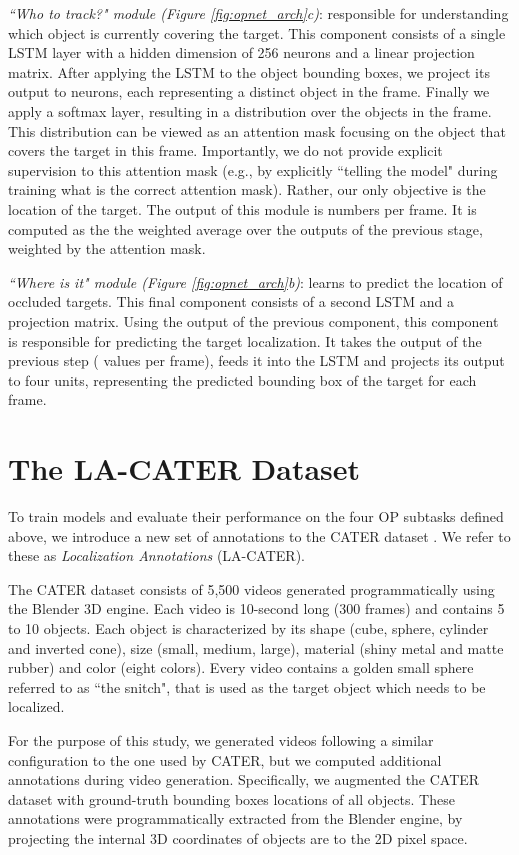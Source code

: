 \documentclass[]{llncs}
\newcommand{\figref}[1]{Figure \ref{#1}}
\begin{document}
\textit{``Who to track?" module (\figref{fig:opnet_arch}c)}: responsible for understanding which object is currently covering the target. This component consists of a single LSTM layer with a hidden dimension of 256 neurons and a linear projection matrix. After applying the LSTM to the object bounding boxes, we project its output to  neurons, each representing a distinct object in the frame.  Finally we apply a softmax layer, resulting in a distribution over the objects in the frame. This distribution can be viewed as an attention mask focusing on the object that covers the target in this frame. Importantly, we do not provide explicit supervision to this attention mask (e.g., by explicitly ``telling the model" during training what is the correct attention mask). Rather, our only objective is the location of the target. The output of this module is  numbers per frame. It is computed as the the weighted average over the  outputs of the previous stage, weighted by the attention mask.

\textit{``Where is it" module (\figref{fig:opnet_arch}b)}: learns to predict the location of occluded targets. This final component consists of a second LSTM and a projection matrix. Using the output of the previous component, this component is responsible for predicting the target localization. It takes the output of the previous step ( values per frame), feeds it into the LSTM and projects its output to four units, representing the predicted bounding box of the target for each frame.

\section{The LA-CATER Dataset}
To train models and evaluate their performance on the four OP subtasks defined above, we introduce a new set of annotations to the CATER dataset \cite{girdhar2019cater}. We refer to these as \textit{Localization Annotations} (LA-CATER). 

The CATER dataset consists of 5,500 videos generated programmatically using the Blender 3D engine. Each video is 10-second long (300 frames) and contains 5 to 10 objects. Each object is characterized by its shape (cube, sphere, cylinder and inverted cone), size (small, medium, large), material (shiny metal and matte rubber) and color (eight colors). Every video contains a golden small sphere referred to as ``the snitch", that is used as the target object which needs to be localized.

For the purpose of this study, we generated videos following a similar configuration to the one used by CATER, but we computed additional annotations during video generation.  Specifically, we augmented the CATER dataset with ground-truth bounding boxes locations of all objects. These annotations were programmatically extracted from the Blender engine, by projecting the internal 3D coordinates of objects are to the 2D pixel space.
\end{document}
